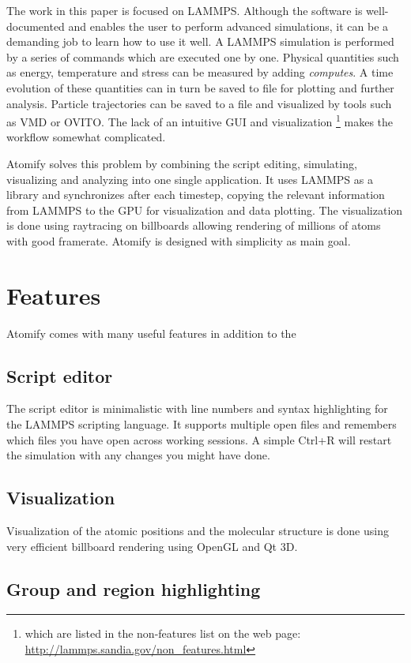 \documentclass[aps,pre,twocolumn,letterpaper,floatfix]{revtex4}
\begin{document}
The work in this paper is focused on LAMMPS. Although the software is well-documented and enables the user to perform advanced simulations, it can be a demanding job to learn how to use it well. A LAMMPS simulation is performed by a series of commands which are executed one by one. Physical quantities such as energy, temperature and stress can be measured by adding \textit{computes}. A time evolution of these quantities can in turn be saved to file for plotting and further analysis. Particle trajectories can be saved to a file and visualized by tools such as VMD\cite{Humphrey1996Vmd} or OVITO\cite{Stukowski2009Visualization}. The lack of an intuitive GUI and visualization \footnote{which are listed in the non-features list on the web page: \url{http://lammps.sandia.gov/non_features.html}} makes the workflow somewhat complicated. 

Atomify solves this problem by combining the script editing, simulating, visualizing and analyzing into one single application. It uses LAMMPS as a library and synchronizes after each timestep, copying the relevant information from LAMMPS to the GPU for visualization and data plotting. The visualization is done using raytracing on billboards allowing rendering of millions of atoms with good framerate. Atomify is designed with simplicity as main goal.

\section{Features}
Atomify comes with many useful features in addition to the 
\subsection{Script editor}
The script editor is minimalistic with line numbers and syntax highlighting for the LAMMPS scripting language. It supports multiple open files and remembers which files you have open across working sessions. A simple Ctrl+R will restart the simulation with any changes you might have done.
\subsection{Visualization}
Visualization of the atomic positions and the molecular structure is done using very efficient billboard rendering using OpenGL and Qt 3D. 

\subsection{Group and region highlighting}
\end{document}
